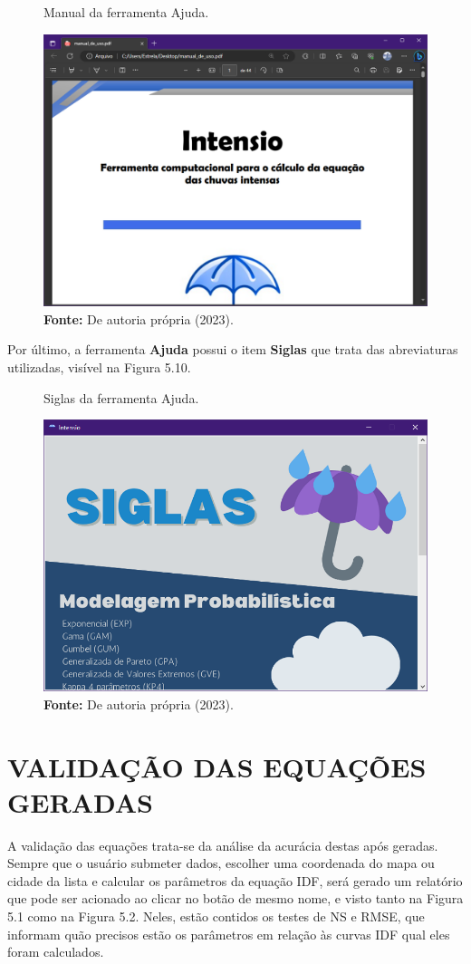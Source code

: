 \begin{figure}[!ht]
	\centering
	\caption{Manual da ferramenta Ajuda.}
	\includegraphics[width=.7625\linewidth]{figuras/manual.png}
	\caption*{\textbf{Fonte:} De autoria própria (2023).}
	\label{fig:figuras/manual.png}
\end{figure}

Por último, a ferramenta \textbf{Ajuda} possui o item \textbf{Siglas} que trata das abreviaturas utilizadas, visível na Figura 5.10.

\begin{figure}[!ht]
	\centering
	\caption{Siglas da ferramenta Ajuda.}
	\includegraphics[width=.7625\linewidth]{figuras/siglas.png}
	\caption*{\textbf{Fonte:} De autoria própria (2023).}
	\label{fig:figuras/siglas.png}
\end{figure}

\newpage

\section{VALIDAÇÃO DAS EQUAÇÕES GERADAS}

A validação das equações trata-se da análise da acurácia destas após geradas. Sempre que o usuário submeter dados, escolher uma coordenada do mapa ou cidade da lista e calcular os parâmetros da equação IDF, será gerado um relatório que pode ser acionado ao clicar no botão de mesmo nome, e visto tanto na Figura 5.1 como na Figura 5.2. Neles, estão contidos os testes de NS e RMSE, que informam quão precisos estão os parâmetros em relação às curvas IDF qual eles foram calculados.

